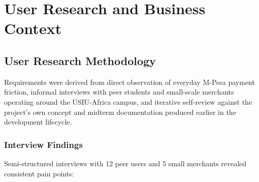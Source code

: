 \documentclass[12pt, a4paper, twoside, openright]{report}
\begin{document}
\chapter{User Research and Business Context}

\section{User Research Methodology}

Requirements were derived from direct observation of everyday M-Pesa payment friction, informal interviews with peer students and small-scale merchants operating around the USIU-Africa campus, and iterative self-review against the project's own concept and midterm documentation produced earlier in the development lifecycle.

\subsection{Interview Findings}

Semi-structured interviews with 12 peer users and 5 small merchants revealed consistent pain points:
\end{document}
